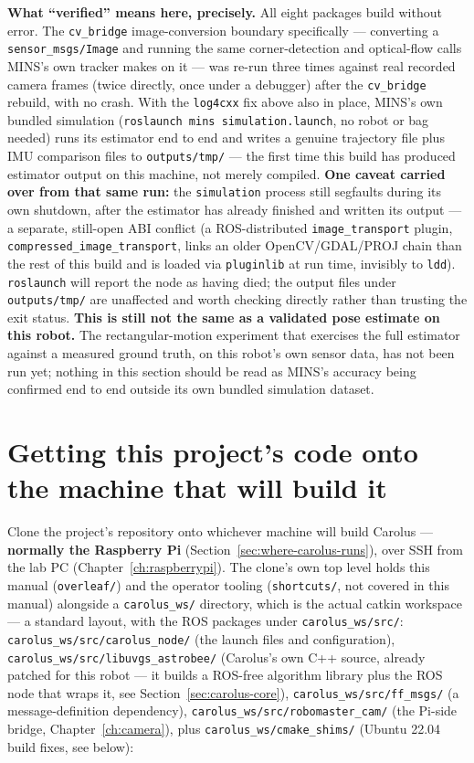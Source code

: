 \documentclass[11pt]{report}
\begin{document}
\textbf{What ``verified'' means here, precisely.} All eight packages build
without error. The \texttt{cv\_bridge} image-conversion boundary specifically
--- converting a \texttt{sensor\_msgs/Image} and running the same
corner-detection and optical-flow calls MINS's own tracker makes on it ---
was re-run three times against real recorded camera frames (twice directly,
once under a debugger) after the \texttt{cv\_bridge} rebuild, with no crash.
With the \texttt{log4cxx} fix above also in place, MINS's own bundled
simulation (\texttt{roslaunch mins simulation.launch}, no robot or bag
needed) runs its estimator end to end and writes a genuine trajectory file
plus IMU comparison files to \texttt{outputs/tmp/} --- the first time this
build has produced estimator output on this machine, not merely compiled.
\textbf{One caveat carried over from that same run:} the \texttt{simulation}
process still segfaults during its own shutdown, after the estimator has
already finished and written its output --- a separate, still-open ABI
conflict (a ROS-distributed \texttt{image\_transport} plugin,
\texttt{compressed\_image\_transport}, links an older OpenCV/GDAL/PROJ chain
than the rest of this build and is loaded via \texttt{pluginlib} at
run time, invisibly to \texttt{ldd}). \texttt{roslaunch} will report the
node as having died; the output files under \texttt{outputs/tmp/} are
unaffected and worth checking directly rather than trusting the exit status.
\textbf{This is still not the same as a validated pose estimate on this
robot.} The rectangular-motion experiment that exercises the full estimator
against a measured ground truth, on this robot's own sensor data, has not
been run yet; nothing in this section should be read as MINS's accuracy
being confirmed end to end outside its own bundled simulation dataset.

\section{Getting this project's code onto the machine that will build it}

Clone the project's repository onto whichever machine will build Carolus
--- \textbf{normally the Raspberry Pi} (Section~\ref{sec:where-carolus-runs}),
over SSH from the lab PC (Chapter~\ref{ch:raspberrypi}). The clone's own
top level holds this manual (\texttt{overleaf/}) and the operator tooling
(\texttt{shortcuts/}, not covered in this manual) alongside a
\texttt{carolus\_ws/} directory, which is the actual catkin workspace ---
a standard layout, with the ROS packages under \texttt{carolus\_ws/src/}:
\texttt{carolus\_ws/src/carolus\_node/} (the launch files and
configuration), \texttt{carolus\_ws/src/libuvgs\_astrobee/} (Carolus's own
C++ source, already patched for this robot --- it builds a ROS-free
algorithm library plus the ROS node that wraps it, see
Section~\ref{sec:carolus-core}),
\texttt{carolus\_ws/src/ff\_msgs/} (a message-definition dependency),
\texttt{carolus\_ws/src/robomaster\_cam/} (the Pi-side bridge,
Chapter~\ref{ch:camera}), plus \texttt{carolus\_ws/cmake\_shims/} (Ubuntu
22.04 build fixes, see below):
\end{document}
